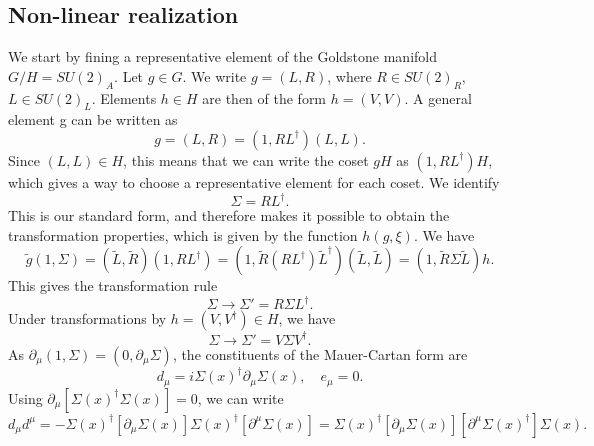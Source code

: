 \subsection*{Non-linear realization}


We start by fining a representative element of the Goldstone manifold $G/H = SU(2)_A$.
Let $g\in G$. 
We write $g = (L, R)$, where $R \in SU(2)_R$, $L \in SU(2)_L$.
Elements $h \in H$ are then of the form $h = (V, V)$.
A general element g can be written as
\begin{equation}
    g = (L, R) = (1, R L^\dagger) (L, L).
\end{equation}
Since $(L, L) \in H$, this means that we can write the coset $g H$ as $(1, R L^\dagger)H$, which gives a way to choose a representative element for each coset.
We identify
\begin{equation}
    \Sigma = R L^\dagger. 
\end{equation}
This is our standard form, and therefore makes it possible to obtain the transformation properties, which is given by the function $h(g, \xi)$.
We have 
\begin{equation}
    \tilde g (1, \Sigma)
    = (\tilde L, \tilde R) (1, R L^\dagger)
    = (1, \tilde R (R L^\dagger) \tilde L^\dagger) (\tilde L, \tilde L)
    = (1, \tilde R \Sigma \tilde L) h.
\end{equation}
This gives the transformation rule
\begin{equation}
    \Sigma \rightarrow \Sigma' = R \Sigma L^\dagger.
\end{equation}
Under transformations by $h = (V, V^\dagger) \in H$, we have
\begin{equation}
    \Sigma \rightarrow \Sigma' = V \Sigma V^\dagger.
\end{equation}
As $\partial_\mu  (1, \Sigma) = (0, \partial_\mu \Sigma)$, the constituents of the Mauer-Cartan form are
\begin{equation}
    d_\mu = i \Sigma(x)^\dagger \partial_\mu \Sigma(x),\quad
    e_\mu = 0.
\end{equation}
Using $\partial_\mu [\Sigma(x)^\dagger\Sigma(x)] = 0 $, we can write
\begin{equation}
    d_\mu d^\mu = 
    - \Sigma(x)^\dagger [\partial_\mu \Sigma(x)] \Sigma(x)^\dagger [\partial^\mu \Sigma(x)]
    =\Sigma(x)^\dagger [\partial_\mu \Sigma(x)] [\partial^\mu \Sigma(x)^\dagger] \Sigma(x).
\end{equation}
